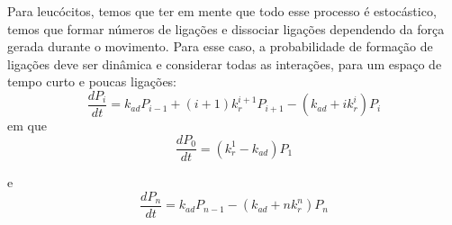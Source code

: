 \documentclass[aspectratio=169]{beamer}
\begin{document}
\begin{frame}
    Para leucócitos, temos que ter em mente que todo esse processo é estocástico, temos que formar números
    de ligações e dissociar ligações dependendo da força gerada durante o movimento.
    Para esse caso, a probabilidade de formação de ligações deve ser dinâmica e considerar todas as interações, para um espaço de tempo curto e poucas ligações:
    \begin{equation}
        \frac{d P_{i}}{dt} = k_{ad} P_{i-1} + (i+1)k_{r}^{i+1}P_{i+1} - (k_{ad} + i k_{r}^{i}) P_{i}
    \end{equation}
    em que
    \begin{equation}
        \frac{dP_{0}}{dt} = (k_{r}^{1} - k_{ad}) P_{1}
    \end{equation}
    
    e
    \begin{equation}
        \frac{d P_{n}}{dt} = k_{ad} P_{n-1} - (k_{ad} + n k^{n}_{r}) P_n      
    \end{equation}
\end{frame}
\end{document}
